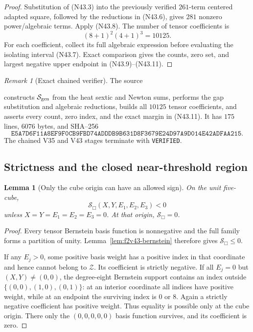 \documentclass[11pt]{article}
\newtheorem{lemma}[theorem]{Lemma}
\theoremstyle{definition}
\theoremstyle{remark}
\newtheorem{remark}[theorem]{Remark}
\begin{document}
\begin{proof}
Substitution of \textup{(N43.3)} into the previously verified
\(261\)-term centered adapted square, followed by the reductions in
\textup{(N43.6)}, gives \(281\) nonzero power/algebraic terms.
Apply \textup{(N43.8)}.  The number of tensor coefficients is
\[
 (8+1)^2(4+1)^3=10125.
\]
For each coefficient, collect its full algebraic expression before
evaluating the isolating interval \textup{(N43.7)}.  Exact comparison
gives the counts, zero set, and largest negative upper endpoint in
\textup{(N43.9)}--\textup{(N43.11)}.
\end{proof}

\begin{remark}[Exact chained verifier]
\label{rem:f2v43-verifier}
The source
\begin{center}
\end{center}
constructs \(\mathcal S_{\rm gen}\) from the heat sextic and Newton sums,
performs the gap substitution and algebraic reductions, builds all
\(10125\) tensor coefficients, and asserts every count, zero index, and
the exact margin in \textup{(N43.11)}.  It has \(175\) lines,
\(6076\) bytes, and SHA--256
\[
 \texttt{E5A7D6F11A8EF9F0CB9FBD74ADDDB9B6}
 \allowbreak\texttt{31D8F3679E24D97A9D014E42ADFAA215}.
\tag{N43.12}
\]
The chained V35 and V43 stages terminate with \texttt{VERIFIED}.
\end{remark}

\subsection{Strictness and the closed near-threshold region}

\begin{lemma}[Only the cube origin can have an allowed sign]
\label{lem:f2v43-strict}
On the unit five-cube,
\[
 \mathcal S_{\Box}(X,Y,E_1,E_2,E_3)<0
\tag{N43.13}
\]
unless \(X=Y=E_1=E_2=E_3=0\).  At that origin,
\(\mathcal S_{\Box}=0\).
\end{lemma}

\begin{proof}
Every tensor Bernstein basis function is nonnegative and the full family
forms a partition of unity.  Lemma~\ref{lem:f2v43-bernstein} therefore
gives \(\mathcal S_{\Box}\leq0\).

If any \(E_j>0\), some positive basis weight has a positive index in that
coordinate and hence cannot belong to \(\mathcal Z\).  Its coefficient is
strictly negative.  If all \(E_j=0\) but \((X,Y)\neq(0,0)\), the
degree-eight Bernstein support contains an index outside
\(\{(0,0),(1,0),(0,1)\}\): at an interior coordinate all indices have
positive weight, while at an endpoint the surviving index is \(0\) or
\(8\).  Again a strictly negative coefficient has positive weight.
Thus equality is possible only at the cube origin.  There only the
\((0,0,0,0,0)\) basis function survives, and its coefficient is zero.
\end{proof}
\end{document}
